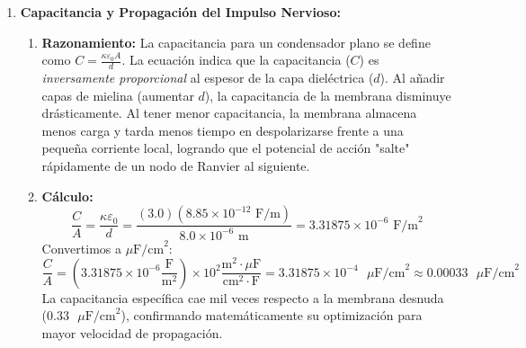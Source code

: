 \documentclass[11pt,letterpaper]{article}
\begin{document}
\begin{enumerate}[leftmargin=*]
    \vspace{0.2cm}

    \item \textbf{Capacitancia y Propagación del Impulso Nervioso:}
    \begin{enumerate}
        \item \textbf{Razonamiento:} La capacitancia para un condensador plano se define como $C = \frac{\kappa \varepsilon_0 A}{d}$. La ecuación indica que la capacitancia ($C$) es \textit{inversamente proporcional} al espesor de la capa dieléctrica ($d$). Al añadir capas de mielina (aumentar $d$), la capacitancia de la membrana disminuye drásticamente. Al tener menor capacitancia, la membrana almacena menos carga y tarda menos tiempo en despolarizarse frente a una pequeña corriente local, logrando que el potencial de acción "salte" rápidamente de un nodo de Ranvier al siguiente.
        \item \textbf{Cálculo:}
        \[
        \frac{C}{A} = \frac{\kappa \varepsilon_0}{d} = \frac{(3.0)(8.85 \times 10^{-12} \text{ F/m})}{8.0 \times 10^{-6} \text{ m}} = 3.31875 \times 10^{-6} \text{ F/m}^2
        \]
        Convertimos a $\mu\text{F/cm}^2$:
        \[
        \frac{C}{A} = \left( 3.31875 \times 10^{-6} \frac{\text{F}}{\text{m}^2} \right) \times 10^2 \frac{\text{m}^2 \cdot \mu\text{F}}{\text{cm}^2 \cdot \text{F}} = 3.31875 \times 10^{-4} \text{ }\mu\text{F/cm}^2 \approx 0.00033 \text{ }\mu\text{F/cm}^2
    \]
    La capacitancia específica cae mil veces respecto a la membrana desnuda ($0.33 \text{ }\mu\text{F/cm}^2$), confirmando matemáticamente su optimización para mayor velocidad de propagación.
    \end{enumerate}

    \vspace{0.2cm}


\end{enumerate}
\end{document}
